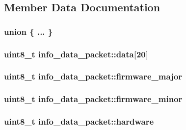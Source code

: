 \subsection{Member Data Documentation}
\hypertarget{structinfo__data__packet_a2c2f67a49766988f454c0bd33c558574}{\subsubsection[{"@21}]{\setlength{\rightskip}{0pt plus 5cm}union \{ ... \} }}\label{structinfo__data__packet_a2c2f67a49766988f454c0bd33c558574}
\hypertarget{structinfo__data__packet_aadb324ab652eb4626f43f664bda87d22}{
\subsubsection[{data}]{\setlength{\rightskip}{0pt plus 5cm}uint8\-\_\-t info\-\_\-data\-\_\-packet\-::data\mbox{[}20\mbox{]}}}\label{structinfo__data__packet_aadb324ab652eb4626f43f664bda87d22}
\hypertarget{structinfo__data__packet_ad4e1cf4e56610f97c2a652883f316d3a}{
\subsubsection[{firmware\-\_\-major}]{\setlength{\rightskip}{0pt plus 5cm}uint8\-\_\-t info\-\_\-data\-\_\-packet\-::firmware\-\_\-major}}\label{structinfo__data__packet_ad4e1cf4e56610f97c2a652883f316d3a}
\hypertarget{structinfo__data__packet_a8e8be6a19d3a61f23242f32383ad45a9}{
\subsubsection[{firmware\-\_\-minor}]{\setlength{\rightskip}{0pt plus 5cm}uint8\-\_\-t info\-\_\-data\-\_\-packet\-::firmware\-\_\-minor}}\label{structinfo__data__packet_a8e8be6a19d3a61f23242f32383ad45a9}
\hypertarget{structinfo__data__packet_a561357c591a36153ba2db03416d211a6}{
\subsubsection[{hardware}]{\setlength{\rightskip}{0pt plus 5cm}uint8\-\_\-t info\-\_\-data\-\_\-packet\-::hardware}}\label{structinfo__data__packet_a561357c591a36153ba2db03416d211a6}
